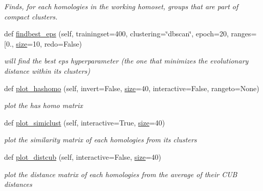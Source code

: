 \begin{DoxyCompactItemize}
\begin{DoxyCompactList}\small\item\em Finds, for each homologies in the working homoset, groups that are part of compact clusters. \end{DoxyCompactList}\item 
def \mbox{\hyperlink{class_py_c_u_b_1_1homoset_1_1_homo_set_a36e6e64142f4cc63425f145a1754d1d6}{findbest\+\_\+eps}} (self, trainingset=400, clustering=\char`\"{}dbscan\char`\"{}, epoch=20, ranges=\mbox{[}0., \mbox{\hyperlink{class_py_c_u_b_1_1homoset_1_1_homo_set_a000511647e3f85d8abadcdddaddfb04d}{size}}=10, redo=False)
\begin{DoxyCompactList}\small\item\em will find the best eps hyperparameter (the one that minimizes the evolutionary distance within its clusters) \end{DoxyCompactList}\item 
def \mbox{\hyperlink{class_py_c_u_b_1_1homoset_1_1_homo_set_a8ab62bae7be17abf4b13ad37d5c881eb}{plot\+\_\+hashomo}} (self, invert=False, \mbox{\hyperlink{class_py_c_u_b_1_1homoset_1_1_homo_set_a000511647e3f85d8abadcdddaddfb04d}{size}}=40, interactive=False, rangeto=None)
\begin{DoxyCompactList}\small\item\em plot the has homo matrix \end{DoxyCompactList}\item 
def \mbox{\hyperlink{class_py_c_u_b_1_1homoset_1_1_homo_set_a87fcd4602c943c98543e2bc552502663}{plot\+\_\+simiclust}} (self, interactive=True, \mbox{\hyperlink{class_py_c_u_b_1_1homoset_1_1_homo_set_a000511647e3f85d8abadcdddaddfb04d}{size}}=40)
\begin{DoxyCompactList}\small\item\em plot the similarity matrix of each homologies from its clusters \end{DoxyCompactList}\item 
def \mbox{\hyperlink{class_py_c_u_b_1_1homoset_1_1_homo_set_aa385d8acea32381efae12c219c24a331}{plot\+\_\+distcub}} (self, interactive=False, \mbox{\hyperlink{class_py_c_u_b_1_1homoset_1_1_homo_set_a000511647e3f85d8abadcdddaddfb04d}{size}}=40)
\begin{DoxyCompactList}\small\item\em plot the distance matrix of each homologies from the average of their C\+UB distances \end{DoxyCompactList}\end{DoxyCompactItemize}
